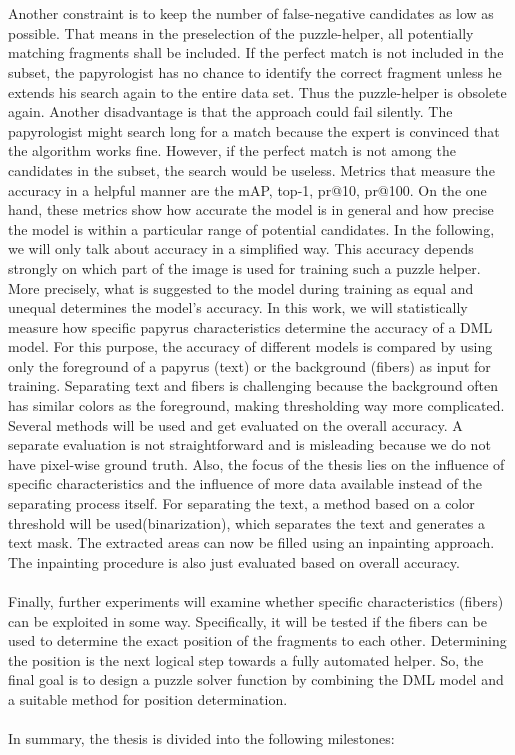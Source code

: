 \documentclass[12pt,a4paper]{article}
\begin{document}
\\\\
Another constraint is to keep the number of false-negative candidates as low as possible. That means in the preselection of the puzzle-helper, all potentially matching fragments shall be included. 
If the perfect match is not included in the subset, the papyrologist has no chance to identify the correct fragment unless he extends his search again to the entire data set. Thus the puzzle-helper is obsolete again. Another disadvantage is that the approach could fail silently. The papyrologist might search long for a match because the expert is convinced that the algorithm works fine. However, if the perfect match is not among the candidates in the subset, the search would be useless. Metrics that measure the accuracy in a helpful manner are the mAP, top-1, pr@10, pr@100.
On the one hand, these metrics show how accurate the model is in general and how precise the model is within a particular range of potential candidates. In the following, we will only talk about accuracy in a simplified way. This accuracy depends strongly on which part of the image is used for training such a puzzle helper. More precisely, what is suggested to the model during training as equal and unequal determines the model's accuracy. In this work, we will statistically measure how specific papyrus characteristics determine the accuracy of a DML model. For this purpose, the accuracy of different models is compared by using only the foreground of a papyrus (text) or the background (fibers) as input for training. 
Separating text and fibers is challenging because the background often has similar colors as the foreground, making thresholding way more complicated. Several methods will be used and get evaluated on the overall accuracy. A separate evaluation is not straightforward and is misleading because we do not have pixel-wise ground truth. Also, the focus of the thesis lies on the influence of specific characteristics and the influence of more data available instead of the separating process itself. For separating the text,  a method based on a color threshold will be used(binarization), which separates the text and generates a text mask. 
The extracted areas can now be filled using an inpainting approach. The inpainting procedure is also just evaluated based on overall accuracy. 
\\\\
Finally, further experiments will examine whether specific characteristics (fibers) can be exploited in some way. Specifically, it will be tested if the fibers can be used to determine the exact position of the fragments to each other. Determining the position is the next logical step towards a fully automated helper. So, the final goal is to design a puzzle solver function by combining the DML model and a suitable method for position determination. 
\\\\
In summary, the thesis is divided into the following milestones:
\end{document}
